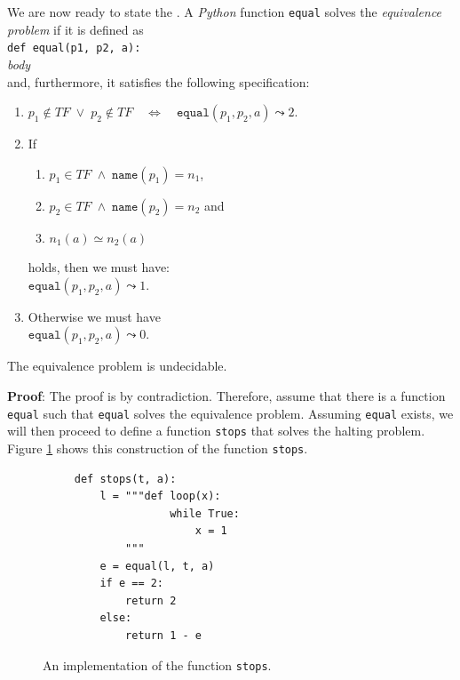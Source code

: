 \noindent
We are now ready to state the .  A \textsl{Python} function \texttt{equal} solves the
\emph{equivalence problem}  if it is defined as
\\[0.2cm]
\hspace*{1.3cm} \texttt{def equal(p1, p2, a):}               \\
\hspace*{2.1cm} \textsl{body}                                \\[0.2cm]
and, furthermore, it satisfies the following specification:
\begin{enumerate}
\item $p_1 \not\in T\!F \;\vee\; p_2 \not\in T\!F \quad\Leftrightarrow\quad \mathtt{equal}(p_1, p_2, a) \leadsto 2$.
\item If 
      \begin{enumerate}
      \item $p_1 \in T\!F \;\wedge\; \mathtt{name}(p_1) = n_1$,
      \item $p_2 \in T\!F \;\wedge\; \mathtt{name}(p_2) = n_2$ \quad and
      \item $n_1(a) \simeq n_2(a)$
      \end{enumerate}
      holds, then we must have: 
      \\[0.2cm]
      \hspace*{1.3cm} 
      $\mathtt{equal}(p_1, p_2, a) \leadsto 1$.
\item Otherwise we must have \\[0.2cm]
      \hspace*{1.3cm} 
      $\mathtt{equal}(p_1, p_2, a) \leadsto 0$.
\end{enumerate}


\begin{Theorem}
The equivalence problem is undecidable.  
\end{Theorem}

\noindent
\textbf{Proof}:
The proof is by contradiction.  Therefore, assume that there is a function \texttt{equal}
such that \texttt{equal} solves the equivalence problem.  Assuming \texttt{equal} exists, we will
then proceed to define a function \texttt{stops} that solves the halting problem.
Figure \ref{fig:stops} shows this construction of the function \texttt{stops}.


\begin{figure}[!h]
  \centering
\begin{verbatim}
     def stops(t, a):
         l = """def loop(x): 
                    while True:
                        x = 1
             """ 
         e = equal(l, t, a)
         if e == 2:
             return 2
         else:
             return 1 - e
\end{verbatim}
  \vspace*{-0.3cm}
  \caption{An implementation of the function \texttt{stops}.}
  \label{fig:stops}
\end{figure}

